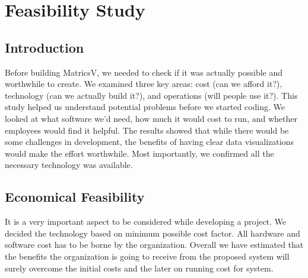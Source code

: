 \chapter{Feasibility Study}


\section{Introduction}


Before building MatricsV, we needed to check if it was actually possible and worthwhile to create. We examined three key areas: cost (can we afford it?), technology (can we actually build it?), and operations (will people use it?). This study helped us understand potential problems before we started coding. We looked at what software we'd need, how much it would cost to run, and whether employees would find it helpful. The results showed that while there would be some challenges in development, the benefits of having clear data visualizations would make the effort worthwhile. Most importantly, we confirmed all the necessary technology was available.





\section{Economical Feasibility}

It is a very important aspect to be considered while developing a project. We decided the technology based on minimum possible cost factor. All hardware and software cost has to be borne by the organization. Overall we have estimated that the benefits the organization is going to receive from the proposed system will surely overcome the initial costs and the later on running cost for system.


